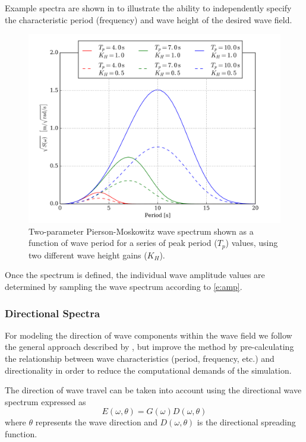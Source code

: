 \documentclass[utf8]{frontiersSCNS} %
\begin{document}
Example spectra are shown in  to illustrate the ability to independently specify the characteristic period (frequency) and wave height of the desired wave field.
\begin{figure}[hbt!]
  \centering
  \includegraphics[width=\SFc\textwidth]{images/pm_spectra_2.png}
  \caption{Two-parameter Pierson-Moskowitz wave spectrum shown as a function of wave period for a series of peak period ($T_p$) values, using two different wave height gains ($K_H$).}
  \label{f:pm}
\end{figure} 
Once the spectrum is defined, the individual wave amplitude values are determined by sampling the wave spectrum according to \eqref{e:amp}.

\subsubsection{Directional Spectra}
For modeling the direction of wave components within the wave field we follow the general approach described by \citet{frechot06realistic}, but improve the method by pre-calculating the relationship between wave characteristics (period, frequency, etc.) and directionality in order to reduce the computational demands of the simulation.

The direction of wave travel can be taken into account using the directional wave spectrum expressed as
\begin{equation}
  E(\omega,\theta)=G(\omega)D(\omega,\theta)
\end{equation}
where $\theta$ represents the wave direction and $D(\omega,\theta)$ is the directional spreading function. %
\end{document}
